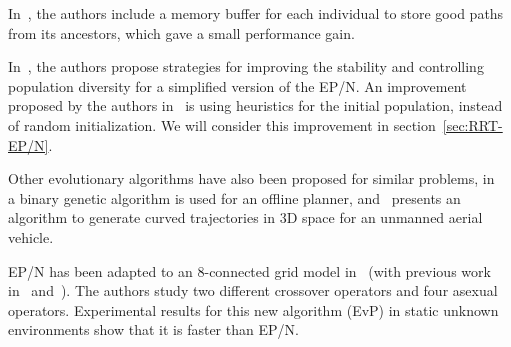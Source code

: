 In~\cite{Trojanowski97}, the authors include a memory buffer for each
individual to store good paths from its ancestors, which gave a small performance
gain.

In~\cite{Elshamli04}, the authors propose strategies for improving the
stability
and controlling population diversity for a simplified version of the EP/N.
An improvement proposed by the authors in~\cite{Xiao97} is using heuristics for the initial
population, instead of random initialization. We will consider this improvement
in section~\ref{sec:RRT-EP/N}.

Other evolutionary algorithms have also been proposed for similar problems, in~%
\cite{Nagib04} a binary genetic algorithm is used for an offline planner, and~%
\cite{Nikolos03} presents an algorithm to generate curved trajectories in 3D
space for an unmanned aerial vehicle.

EP/N has been adapted to an 8-connected grid model in~%
\cite{Alfaro08} (with previous work in~\cite{Alfaro05} and~\cite{Alfaro05-2}).
The authors study two different crossover operators and four asexual operators.
Experimental results for this new algorithm (EvP) in static unknown environments
show that it is faster than EP/N.
